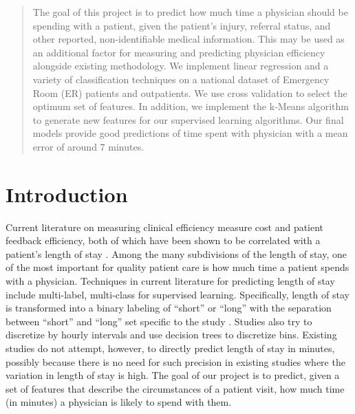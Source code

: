 \documentclass[english]{article}
\begin{document}
 



\begin{abstract}
The goal of this project is to predict how much time a physician should be spending with a patient, given the patient's injury, referral status, and other reported, non-identifiable medical information.
This may be used as an additional factor for measuring and predicting physician efficiency alongside existing methodology.
We implement linear regression and a variety of classification techniques on a national dataset of Emergency Room (ER) patients and outpatients.
We use cross validation to select the optimum set of features.
In addition, we implement the k-Means algorithm to generate new features for our supervised learning algorithms.
Our final models provide good predictions of time spent with physician with a mean error of around 7 minutes.
\end{abstract}


\section{Introduction}

Current literature on measuring clinical efficiency measure cost and patient feedback efficiency, both of which have been shown to be correlated with a patient's length of stay \cite{kroch2007hospital}.
Among the many subdivisions of the length of stay, one of the most important for quality patient care is how much time a patient spends with a physician. 
Techniques in current literature for predicting length of stay include multi-label, multi-class for supervised learning.
Specifically, length of stay is transformed into a binary labeling of ``short'' or ``long'' with the separation between ``short'' and ``long'' set specific to the study \cite{snyder2010data}.
Studies also try to discretize by hourly intervals and use decision trees to discretize bins.
Existing studies do not attempt, however, to directly predict length of stay in minutes, possibly because there is no need for such precision in existing studies where the variation in length of stay is high.
The goal of our project is to predict, given a set of features that describe the circumstances of a patient visit, how much time (in minutes) a physician is likely to spend with them. 
\end{document}
